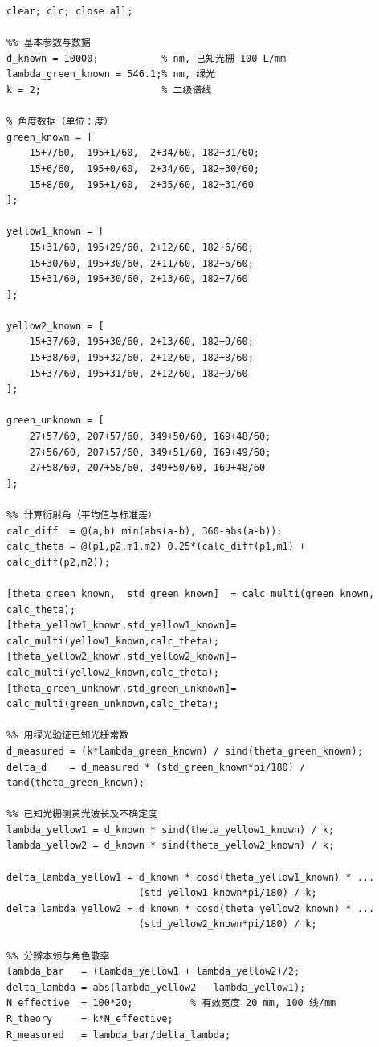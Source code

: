﻿\documentclass[12pt,a4paper]{article}
\begin{document}
\begin{lstlisting}[style=Matlab-boxed,caption={光栅实验数据处理代码}]
clear; clc; close all;

%% 基本参数与数据
d_known = 10000;           % nm, 已知光栅 100 L/mm
lambda_green_known = 546.1;% nm, 绿光
k = 2;                     % 二级谱线

% 角度数据（单位：度）
green_known = [
    15+7/60,  195+1/60,  2+34/60, 182+31/60;
    15+6/60,  195+0/60,  2+34/60, 182+30/60;
    15+8/60,  195+1/60,  2+35/60, 182+31/60
];

yellow1_known = [
    15+31/60, 195+29/60, 2+12/60, 182+6/60;
    15+30/60, 195+30/60, 2+11/60, 182+5/60;
    15+31/60, 195+30/60, 2+13/60, 182+7/60
];

yellow2_known = [
    15+37/60, 195+30/60, 2+13/60, 182+9/60;
    15+38/60, 195+32/60, 2+12/60, 182+8/60;
    15+37/60, 195+31/60, 2+12/60, 182+9/60
];

green_unknown = [
    27+57/60, 207+57/60, 349+50/60, 169+48/60;
    27+56/60, 207+57/60, 349+51/60, 169+49/60;
    27+58/60, 207+58/60, 349+50/60, 169+48/60
];

%% 计算衍射角（平均值与标准差）
calc_diff  = @(a,b) min(abs(a-b), 360-abs(a-b));
calc_theta = @(p1,p2,m1,m2) 0.25*(calc_diff(p1,m1) + calc_diff(p2,m2));

[theta_green_known,  std_green_known]  = calc_multi(green_known,  calc_theta);
[theta_yellow1_known,std_yellow1_known]= calc_multi(yellow1_known,calc_theta);
[theta_yellow2_known,std_yellow2_known]= calc_multi(yellow2_known,calc_theta);
[theta_green_unknown,std_green_unknown]= calc_multi(green_unknown,calc_theta);

%% 用绿光验证已知光栅常数
d_measured = (k*lambda_green_known) / sind(theta_green_known);
delta_d    = d_measured * (std_green_known*pi/180) / tand(theta_green_known);

%% 已知光栅测黄光波长及不确定度
lambda_yellow1 = d_known * sind(theta_yellow1_known) / k;
lambda_yellow2 = d_known * sind(theta_yellow2_known) / k;

delta_lambda_yellow1 = d_known * cosd(theta_yellow1_known) * ...
                       (std_yellow1_known*pi/180) / k;
delta_lambda_yellow2 = d_known * cosd(theta_yellow2_known) * ...
                       (std_yellow2_known*pi/180) / k;

%% 分辨本领与角色散率
lambda_bar   = (lambda_yellow1 + lambda_yellow2)/2;
delta_lambda = abs(lambda_yellow2 - lambda_yellow1);
N_effective  = 100*20;          % 有效宽度 20 mm, 100 线/mm
R_theory     = k*N_effective;
R_measured   = lambda_bar/delta_lambda;


\end{lstlisting}
\end{document}
